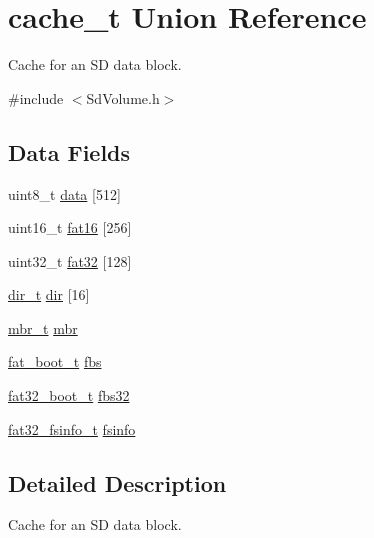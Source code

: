 \hypertarget{unioncache__t}{\section{cache\-\_\-t Union Reference}
\label{unioncache__t}
}


Cache for an S\-D data block.  




{\ttfamily \#include $<$Sd\-Volume.\-h$>$}

\subsection*{Data Fields}
\begin{DoxyCompactItemize}
\item 
uint8\-\_\-t \hyperlink{unioncache__t_a3d71d6f767b902517cdc2a90b93d93ef}{data} \mbox{[}512\mbox{]}
\item 
uint16\-\_\-t \hyperlink{unioncache__t_afbc2aee9e685ba2ec0b2a3e4cfbaefed}{fat16} \mbox{[}256\mbox{]}
\item 
uint32\-\_\-t \hyperlink{unioncache__t_ae7eca49d4c578b2d41d0ca2edfa65a11}{fat32} \mbox{[}128\mbox{]}
\item 
\hyperlink{_sd_fat_structs_8h_a803db59d4e16a0c54a647afc6a7954e3}{dir\-\_\-t} \hyperlink{unioncache__t_a6d2e24ad404317d817f7691495f9fa5b}{dir} \mbox{[}16\mbox{]}
\item 
\hyperlink{_sd_fat_structs_8h_a7c429e5097f101c8c97663d6c4155bd9}{mbr\-\_\-t} \hyperlink{unioncache__t_ab085ad5652aa1dcd3d1c289126acb76e}{mbr}
\item 
\hyperlink{_sd_fat_structs_8h_aedac4595ee08198da26c14b9891a07d5}{fat\-\_\-boot\-\_\-t} \hyperlink{unioncache__t_af7dac1f364d9df2fab1065761459085a}{fbs}
\item 
\hyperlink{_sd_fat_structs_8h_a38fa081d004647a828095d31b07ec491}{fat32\-\_\-boot\-\_\-t} \hyperlink{unioncache__t_a8a286df1a2c7d0d8c19f0bc92f4a37a0}{fbs32}
\item 
\hyperlink{_sd_fat_structs_8h_a6030ed0fce3a819326a2548407fc8556}{fat32\-\_\-fsinfo\-\_\-t} \hyperlink{unioncache__t_ad5b9c8824c92202c5f442fd4da58772a}{fsinfo}
\end{DoxyCompactItemize}


\subsection{Detailed Description}
Cache for an S\-D data block. 

